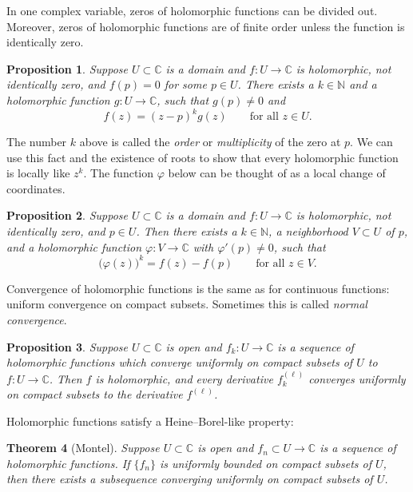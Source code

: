 \documentclass[12pt,openany]{book}
\newcommand{\C}{{\mathbb{C}}}
\newcommand{\N}{{\mathbb{N}}}
\newcommand{\myindex}[1]{#1\index{#1}}
\theoremstyle{plain}
\newtheorem{thm}{Theorem}[section]
\newtheorem{prop}[thm]{Proposition}
\theoremstyle{remark}
\theoremstyle{definition}
\theoremstyle{exercise}
\theoremstyle{example}
\begin{document}
In one complex variable, zeros of holomorphic functions
can be divided out.  Moreover, zeros
of holomorphic functions are of finite order unless
the function is identically zero.

\begin{prop}
Suppose $U \subset \C$ is a domain and
$f \colon U \to \C$ is holomorphic, not identically zero, and $f(p) = 0$
for some $p \in U$.  There exists a $k \in \N$ and
a holomorphic function $g \colon U \to \C$,
such that $g(p) \not= 0$ and
\begin{equation*}
f(z) = {(z-p)}^k g(z) \qquad \text{for all $z \in U$.}
\end{equation*}
\end{prop}

The number $k$ above is called the \emph{order}
or \emph{multiplicity}
of the zero at $p$.
We can use this fact and the existence of roots to show that every
holomorphic function is locally like $z^k$.  The function $\varphi$
below can be thought of as a local change of coordinates.

\begin{prop}
Suppose $U \subset \C$ is a domain and
$f \colon U \to \C$ is holomorphic, not identically zero, and $p \in U$.
Then there exists a $k \in \N$,
a neighborhood $V \subset U$ of $p$,  and
a holomorphic function $\varphi \colon V \to \C$ with 
$\varphi'(p) \not= 0$, such that
\begin{equation*}
{\bigl(\varphi(z)\bigr)}^k = f(z) - f(p)
\qquad \text{for all $z \in V$.}
\end{equation*}
\end{prop}

Convergence of holomorphic functions is the same as for continuous
functions: uniform convergence on compact subsets.
Sometimes this is called \emph{\myindex{normal convergence}}.

\begin{prop}
Suppose $U \subset \C$ is open and $f_k \colon U \to \C$ is
a sequence of holomorphic functions which converge uniformly
on compact subsets of $U$ to $f \colon U \to \C$.  Then $f$ is holomorphic,
and every derivative $f_k^{(\ell)}$ converges uniformly on compact subsets
to the derivative $f^{(\ell)}$.
\end{prop}

Holomorphic functions satisfy a Heine--Borel-like property:

\begin{thm}[Montel]\label{thm:onevarmontel}
Suppose
$U \subset \C$ is open and
$f_n \subset U \to \C$ is a sequence of holomorphic functions.
If $\{ f_n \}$ is uniformly bounded on compact subsets of $U$,
then there exists a subsequence converging uniformly on compact subsets
of $U$.
\end{thm}
\end{document}
